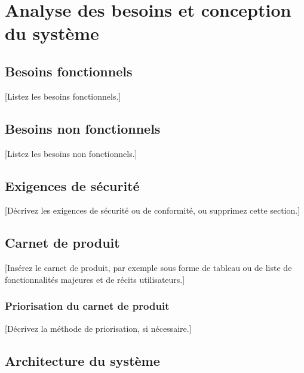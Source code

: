 \chapter{Analyse des besoins et conception du système}

\minitoc

\section{Besoins fonctionnels}
[Listez les besoins fonctionnels.]

\section{Besoins non fonctionnels}
[Listez les besoins non fonctionnels.]

\section{Exigences de sécurité}
[Décrivez les exigences de sécurité ou de conformité, ou supprimez cette section.]

\section{Carnet de produit}
[Insérez le carnet de produit, par exemple sous forme de tableau ou de liste de fonctionnalités majeures et de récits utilisateurs.]

\subsection{Priorisation du carnet de produit}
[Décrivez la méthode de priorisation, si nécessaire.]

\section{Architecture du système}

